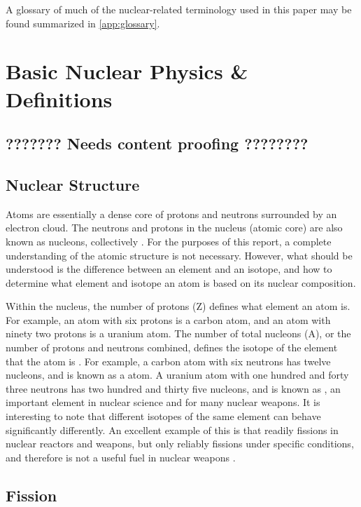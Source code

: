 \documentclass{report}
\begin{document}
A glossary of much of the nuclear-related terminology used in this paper may be found summarized in  \autoref{app:glossary}.

\section{Basic Nuclear Physics \& Definitions}

\subsection{???????  Needs content proofing   ????????}

\subsection{Nuclear Structure}

Atoms are essentially a dense core of protons and neutrons surrounded by an electron cloud. The neutrons and protons in the nucleus (atomic core) are also known as nucleons, collectively \cite{krane1987introductory}. For the purposes of this report, a complete understanding of the atomic structure is not necessary. However, what should be understood is the difference between an element and an isotope, and how to determine what element and isotope an atom is based on its nuclear composition. 

Within the nucleus, the number of protons (Z) defines what element an atom is. For example, an atom with six protons is a carbon atom, and an atom with ninety two protons is a uranium atom. The number of total nucleons (A), or the number of protons and neutrons combined, defines the isotope of the element that the atom is \cite{krane1987introductory}. For example, a carbon atom with six neutrons has twelve nucleons, and is known as a  atom. A uranium atom with one hundred and forty three neutrons has two hundred and thirty five nucleons, and is known as , an important element in nuclear science and for many nuclear weapons. It is interesting to note that different isotopes of the same element can behave significantly differently. An excellent example of this is that  readily fissions in nuclear reactors and weapons, but  only reliably fissions under specific conditions, and therefore is not a useful fuel in nuclear weapons \cite{krane1987introductory,Duderstadt1976}. 


\subsection{Fission}
\end{document}
